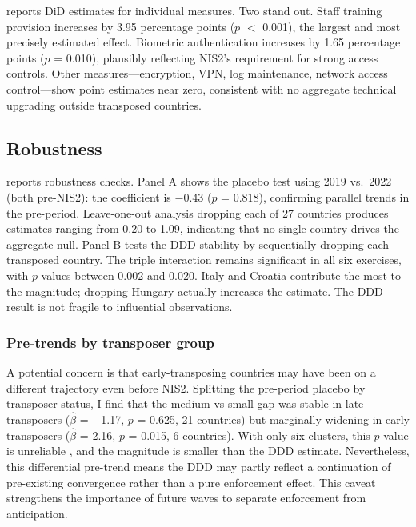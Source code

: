 \documentclass[12pt]{article}
\begin{document}


 reports DiD estimates for individual measures. Two stand out. Staff training provision increases by 3.95 percentage points ($p$ $<$ 0.001), the largest and most precisely estimated effect. Biometric authentication increases by 1.65 percentage points ($p$ = 0.010), plausibly reflecting NIS2's requirement for strong access controls. Other measures---encryption, VPN, log maintenance, network access control---show point estimates near zero, consistent with no aggregate technical upgrading outside transposed countries.

\subsection{Robustness}



 reports robustness checks. Panel A shows the placebo test using 2019 vs.\ 2022 (both pre-NIS2): the coefficient is $-$0.43 ($p$ = 0.818), confirming parallel trends in the pre-period. Leave-one-out analysis dropping each of 27 countries produces estimates ranging from 0.20 to 1.09, indicating that no single country drives the aggregate null. Panel B tests the DDD stability by sequentially dropping each transposed country. The triple interaction remains significant in all six exercises, with $p$-values between 0.002 and 0.020. Italy and Croatia contribute the most to the magnitude; dropping Hungary actually increases the estimate. The DDD result is not fragile to influential observations.

\subsubsection*{Pre-trends by transposer group} A potential concern is that early-transposing countries may have been on a different trajectory even before NIS2. Splitting the pre-period placebo by transposer status, I find that the medium-vs-small gap was stable in late transposers ($\hat{\beta}$ = $-$1.17, $p$ = 0.625, 21 countries) but marginally widening in early transposers ($\hat{\beta}$ = 2.16, $p$ = 0.015, 6 countries). With only six clusters, this $p$-value is unreliable \citep{cameron2008bootstrap}, and the magnitude is smaller than the DDD estimate. Nevertheless, this differential pre-trend means the DDD may partly reflect a continuation of pre-existing convergence rather than a pure enforcement effect. This caveat strengthens the importance of future waves to separate enforcement from anticipation.
\end{document}
